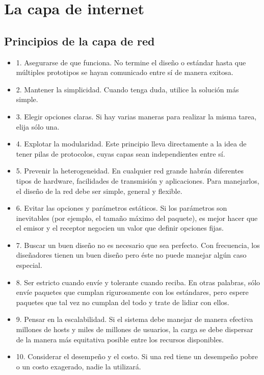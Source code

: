\documentclass[10pt,a4paper]{report}
\begin{document}
\section{La capa de internet}

	\subsection{Principios de la capa de red}
	\begin{itemize}
		\item 1. Asegurarse de que funciona. No termine el diseño o estándar hasta que múltiples prototipos se hayan comunicado entre sí de manera exitosa.
 		\item 2. Mantener la simplicidad. Cuando tenga duda, utilice la solución más simple.
 		\item 3. Elegir opciones claras. Si hay varias maneras para realizar la misma tarea, elija sólo una.
  		\item 4. Explotar la modularidad. Este principio lleva directamente a la idea de tener pilas de protocolos, cuyas capas sean independientes entre sí.
		\item 5. Prevenir la heterogeneidad. En cualquier red grande habrán diferentes tipos de hardware, facilidades de transmisión y aplicaciones. Para manejarlos, el diseño de la red debe ser simple, general y flexible.
		\item 6. Evitar las opciones y parámetros estáticos. Si los parámetros son inevitables (por ejemplo, el tamaño máximo del paquete), es mejor hacer que el emisor y el receptor negocien un valor que definir opciones fijas.
		\item 7. Buscar un buen diseño no es necesario que sea perfecto. Con frecuencia, los diseñadores tienen
un buen diseño pero éste no puede manejar algún caso especial.
		\item 8. Ser estricto cuando envíe y tolerante cuando reciba. En otras palabras, sólo envíe paquetes que
cumplan rigurosamente con los estándares, pero espere paquetes que tal vez no cumplan del todo
y trate de lidiar con ellos.
		\item 9. Pensar en la escalabilidad. Si el sistema debe manejar de manera efectiva millones de hosts y
miles de millones de usuarios, la carga se debe dispersar de la manera más equitativa posible entre los recursos disponibles.
		\item 10. Considerar el desempeño y el costo. Si una red tiene un desempeño pobre o un costo exagerado,
nadie la utilizará.
	\end{itemize}
\end{document}
